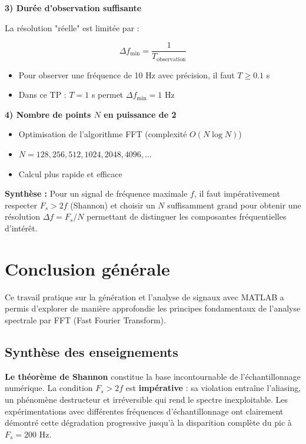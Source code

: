 \documentclass[12pt,a4paper]{article}
\begin{document}
\textbf{3) Durée d'observation suffisante}

La résolution "réelle" est limitée par :

\begin{equation}
    \Delta f_{\min} = \frac{1}{T_{\text{observation}}}
\end{equation}

\begin{itemize}
    \item Pour observer une fréquence de 10 Hz avec précision, il faut $T \geq 0.1$ s
    \item Dans ce TP : $T = 1$ s permet $\Delta f_{\min} = 1$ Hz
\end{itemize}

\textbf{4) Nombre de points $N$ en puissance de 2}

\begin{itemize}
    \item Optimisation de l'algorithme FFT (complexité $O(N \log N)$)
    \item $N = 128, 256, 512, 1024, 2048, 4096, \ldots$
    \item Calcul plus rapide et efficace
\end{itemize}

\vspace{0.5cm}

\textbf{Synthèse :} Pour un signal de fréquence maximale $f$, il faut impérativement respecter $F_s > 2f$ (Shannon) et choisir un $N$ suffisamment grand pour obtenir une résolution $\Delta f = F_s/N$ permettant de distinguer les composantes fréquentielles d'intérêt.

\newpage

\section{Conclusion générale}

Ce travail pratique sur la génération et l'analyse de signaux avec MATLAB a permis d'explorer de manière approfondie les principes fondamentaux de l'analyse spectrale par FFT (Fast Fourier Transform).

\subsection{Synthèse des enseignements}

\textbf{Le théorème de Shannon} constitue la base incontournable de l'échantillonnage numérique. La condition $F_s > 2f$ est \textbf{impérative} : sa violation entraîne l'aliasing, un phénomène destructeur et irréversible qui rend le spectre inexploitable. Les expérimentations avec différentes fréquences d'échantillonnage ont clairement démontré cette dégradation progressive jusqu'à la disparition complète du pic à $F_s = 200$ Hz.
\end{document}
